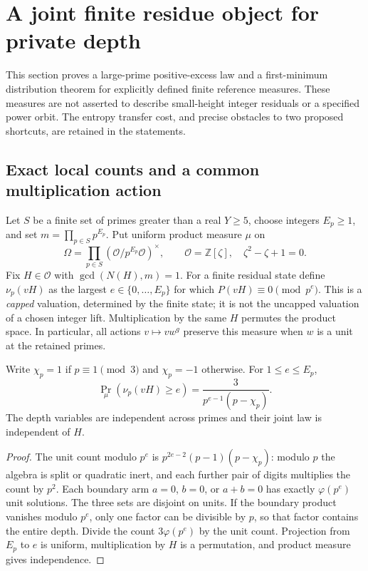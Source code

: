 \section{A joint finite residue object for private depth}
\label{om-section}
This section proves a large-prime positive-excess law and a first-minimum
distribution theorem for explicitly defined finite reference measures.
These measures are not asserted to describe small-height integer residuals
or a specified power orbit. The entropy transfer cost, and precise obstacles
to two proposed shortcuts, are retained in the statements.

\subsection{Exact local counts and a common multiplication action}
Let $S$ be a finite set of primes greater than a real $Y\ge5$, choose
integers $E_p\ge1$, and set $m=\prod_{p\in S}p^{E_p}$. Put uniform product
measure $\mu$ on
\[
 \Omega=\prod_{p\in S}(\mathcal O/p^{E_p}\mathcal O)^\times,
 \qquad\mathcal O=\mathbb Z[\zeta],\quad\zeta^2-\zeta+1=0.
\]
Fix $H\in\mathcal O$ with $\gcd(N(H),m)=1$. For a finite residual state
define $\nu_p(vH)$ as the largest $e\in\{0,\ldots,E_p\}$ for which
$P(vH)\equiv0\pmod{p^e}$. This is a \emph{capped} valuation, determined
by the finite state; it is not the uncapped valuation of a chosen integer lift.
Multiplication by the same $H$ permutes the product space. In particular,
all actions $v\mapsto vw^g$ preserve this measure when $w$ is a unit at the
retained primes.

\begin{theorem}\label{om-local}
Write $\chi_p=1$ if $p\equiv1\pmod3$ and $\chi_p=-1$ otherwise. For
$1\le e\le E_p$,
\[
 \Pr_\mu(\nu_p(vH)\ge e)=\frac3{p^{e-1}(p-\chi_p)}.
\]
The depth variables are independent across primes and their joint law is
independent of $H$.
\end{theorem}
\begin{proof}
The unit count modulo $p^e$ is $p^{2e-2}(p-1)(p-\chi_p)$: modulo $p$
the algebra is split or quadratic inert, and each further pair of digits
multiplies the count by $p^2$. Each boundary arm $a=0$, $b=0$, or $a+b=0$
has exactly $\varphi(p^e)$ unit solutions. The three sets are disjoint on
units. If the boundary product vanishes modulo $p^e$, only one factor can
be divisible by $p$, so that factor contains the entire depth. Divide the
count $3\varphi(p^e)$ by the unit count. Projection from $E_p$ to $e$ is
uniform, multiplication by $H$ is a permutation, and product measure gives
independence.
\end{proof}

